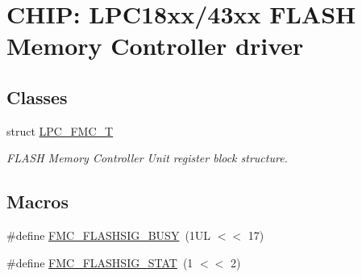 \hypertarget{group___f_m_c__18_x_x__43_x_x}{}\section{C\+H\+IP\+: L\+P\+C18xx/43xx F\+L\+A\+SH Memory Controller driver}
\label{group___f_m_c__18_x_x__43_x_x}
\subsection*{Classes}
\begin{DoxyCompactItemize}
\item 
struct \hyperlink{struct_l_p_c___f_m_c___t}{L\+P\+C\+\_\+\+F\+M\+C\+\_\+T}
\begin{DoxyCompactList}\small\item\em F\+L\+A\+SH Memory Controller Unit register block structure. \end{DoxyCompactList}\end{DoxyCompactItemize}
\subsection*{Macros}
\begin{DoxyCompactItemize}
\item 
\#define \hyperlink{group___f_m_c__18_x_x__43_x_x_ga1c732efb3127d9e699c46b4a89706639}{F\+M\+C\+\_\+\+F\+L\+A\+S\+H\+S\+I\+G\+\_\+\+B\+U\+SY}~(1\+U\+L $<$$<$ 17)
\item 
\#define \hyperlink{group___f_m_c__18_x_x__43_x_x_ga3d2c7a30422c68c08d48b4e4f03a2787}{F\+M\+C\+\_\+\+F\+L\+A\+S\+H\+S\+I\+G\+\_\+\+S\+T\+AT}~(1 $<$$<$ 2)
\end{DoxyCompactItemize}
